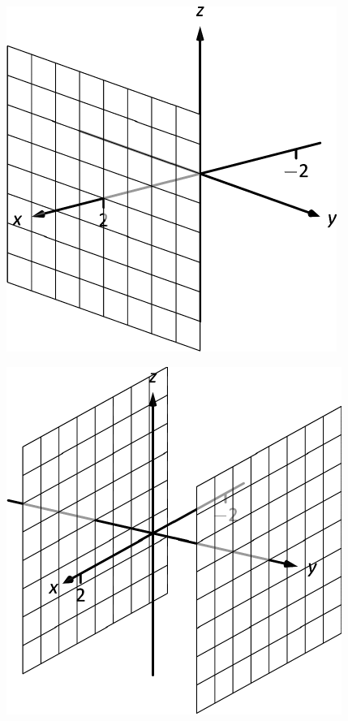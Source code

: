 \documentclass[10pt]{article}
\begin{document}
\includegraphics{figspace2_3DBW.pdf}
\texttt{}

\includegraphics{figspace3_3DBW.pdf}
\texttt{}
\end{document}
